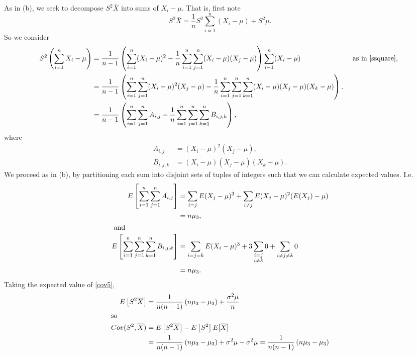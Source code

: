 \documentclass{stat_homework}
\begin{document}
  \begin{solution}
  As in (b), we seek to decompose $S^2 \bar X$ into sums of $X_i - \mu$.  That is, first note
  \begin{equation}  
    S^2 \bar X = \frac 1n S^2 \sum_{i=1}^n (X_i - \mu) + S^2 \mu.
    \label{cov5}
  \end{equation}
  So we consider
  \begin{align*}
    S^2 \left(\sum_{i=1}^n X_i - \mu\right)
    &=\frac 1{n-1} \left( \sum_{i=1}^n (X_i -\mu)^2 - \frac 1n \sum_{i=1}^n\sum_{j=1}^n (X_i - \mu)(X_j - \mu) \right)\sum_{i-1}^n (X_i - \mu) &\text{ as in \eqref{ssquare}, }  \\
    &=\frac 1{n-1} \left( \ssum(X_i -\mu)^2(X_j-\mu) - \frac 1n \sssum(X_i - \mu)(X_j - \mu)(X_k - \mu) \right).\\
    &=\frac 1{n-1} \left( \ssum A_{i,j} - \frac 1n \sssum B_{i,j,k} \right),
  \end{align*}
  where
  \begin{align*}
  A_{i,j} &= (X_i -\mu)^2(X_j-\mu),\\
  B_{i,j,k} &= (X_i - \mu)(X_j - \mu)(X_k - \mu).
  \end{align*} 
  We proceed as in (b), by partitioning each sum into disjoint sets of tuples of integers such that we can calculate expected values.  I.e.
  \begin{align*}
    E\left[\ssum A_{i,j}\right]
    &= \sum_{i=j} E(X_j-\mu)^3 + \sum_{i\not=j} E(X_j-\mu)^2(E(X_j) - \mu)\\
    &= n\mu_3,\\
  \intertext{ and }
    E\left[\sssum B_{i,j,k} \right]
    &= \sum_{i=j=k} E(X_i - \mu)^3 + 3 \sum_{\substack{i=j\\i\not=k}} 0 + \sum_{i\not=j\not=k} 0\\
    &= n \mu_3.
  \end{align*}
  Taking the expected value of \eqref{cov5},
  \begin{align*}
  E\left[S^2 \bar X\right] 
  &= \frac {1}{n(n-1)} \left( n\mu_3  - \mu_3\right) +\frac{\sigma^2 \mu}{n} \\
  \intertext{so}
  Cov(S^2,\bar X)
  &= E\left[S^2 \bar X\right] - E\left[ S^2 \right] E[ \bar X] \\
  &= \frac {1}{n(n-1)} \left( n\mu_3  - \mu_3\right) +\sigma^2 \mu - \sigma^2 \mu = \frac {1}{n(n-1)} \left( n\mu_3  - \mu_3\right)\\
  \end{align*}
  \end{solution}
\end{document}
